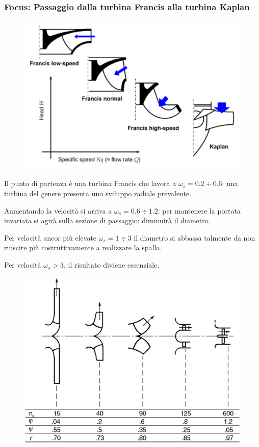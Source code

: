 \documentclass[a4paper, 15pt]{article}
\begin{document}
\subsubsection{Focus: Passaggio dalla turbina Francis alla turbina Kaplan}		
\begin{adjustwidth}{2in}{}
\begin{figure}[H]
	\centering
	\includegraphics[width=0.5\linewidth]{"immagini/trasizionefranciskaplan"}
	\label{fig:trasizionefranciskaplan}
\end{figure}
	Il punto di partenza è una turbina Francis che lavora a $\omega_s=0.2\div0.6$: una turbina del genere presenta uno sviluppo radiale prevalente. 

	Aumentando la velocità si arriva a $\omega_s=0.6\div1.2$: per mantenere la portata invariata si agirà sulla sezione di passaggio: diminuirà il diametro. 

	Per velocità ancor più elevate $\omega_s=1\div3$ il diametro si abbassa talmente da non riuscire più costruttivamente a realizzare la spalla.


	Per velocità $\omega_s>3$, il risultato diviene essenziale.
\begin{figure}[H]
	\centering
	\includegraphics[width=0.5\linewidth]{"immagini/trasizionefranciskaplan1"}
	\label{fig:trasizionefranciskaplan1}
\end{figure}	 
\end{adjustwidth}
\end{document}
